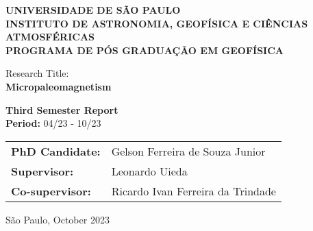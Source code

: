 \begin{titlepage}
   \begin{center}
        \vspace*{0.5cm}
        \small{\textbf{UNIVERSIDADE DE SÃO PAULO\\INSTITUTO DE ASTRONOMIA, GEOFÍSICA E CIÊNCIAS ATMOSFÉRICAS\\PROGRAMA DE PÓS GRADUAÇÃO EM GEOFÍSICA}}
        
        \vfill
        \large{Research Title:\\\textbf{Micropaleomagnetism}}
            
        \vfill
        \normalsize{
            \textbf{Third Semester Report}\\
            \textbf{Period:} 04/23 - 10/23
            \vfill
     
        \begin{center}
        \begin{tabular}{l l}
            \textbf{PhD Candidate:} & Gelson Ferreira de Souza Junior\\
            \textbf{Supervisor:}  & Leonardo Uieda\\
            \textbf{Co-supervisor:} &  Ricardo Ivan Ferreira da Trindade\\
        \end{tabular}
        \end{center}

        
        }
        
        \vfill
        \normalsize{São Paulo, October 2023}
            
   \end{center}
\end{titlepage}

